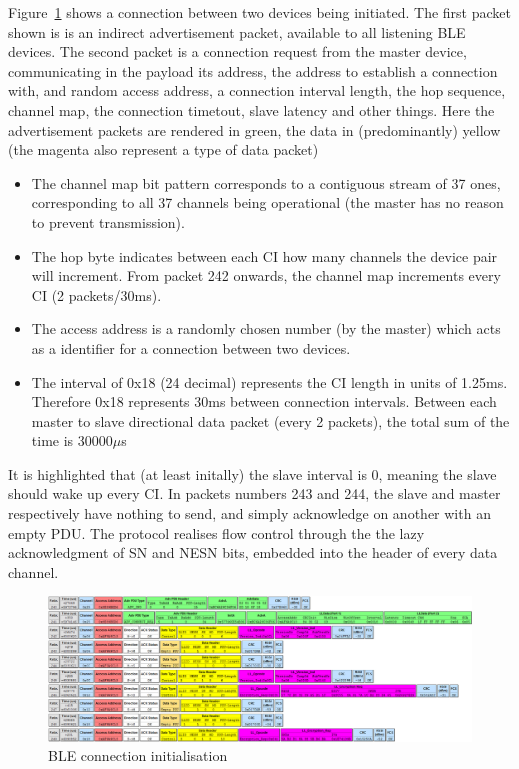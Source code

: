 \documentclass[]{article}
\begin{document}
Figure~\ref{fig:connection} shows a connection between two devices being initiated. The first packet shown is is an indirect advertisement packet, available to all listening \ac{BLE} devices. The second packet is a connection request from the master device, communicating in the payload its address, the address to establish a connection with, and random access address, a connection interval length, the hop sequence, channel map, the connection timetout, slave latency and other things. Here the advertisement packets are rendered in green, the data in (predominantly) yellow (the magenta also represent a type of data packet)
\begin{itemize}

 \item The channel map bit pattern corresponds to a contiguous stream of 37 ones, corresponding to all 37 channels being operational (the master has no reason to prevent transmission). 
 \item The hop byte indicates between each \ac{CI} how many channels the device pair will increment. From packet 242 onwards, the channel map increments every \ac{CI} (2 packets/30ms).
 \item The access address is a randomly chosen number (by the master) which acts as a identifier for a connection between two devices. 
 \item The interval of 0x18 (24 decimal) represents the \ac{CI} length in units of 1.25ms. Therefore 0x18 represents 30ms between connection intervals. Between each master to slave directional data packet (every 2 packets), the total sum of the time is 30000$\mu$s

\end{itemize}

It is highlighted that (at least initally) the slave interval is 0, meaning the slave should wake up every \ac{CI}. In packets numbers 243 and 244, the slave and master respectively have nothing to send, and simply acknowledge on another with an empty \ac{PDU}. The protocol realises flow control through the the lazy acknowledgment of \ac{SN} and \ac{NESN} bits, embedded into the header of every data channel.

\begin{figure}[!h]
	\begin{center}
		\includegraphics[width = 1.4\textwidth, angle=90]{connection}
	\end{center}
	\caption{\ac{BLE} connection initialisation}
	\label{fig:connection}
\end{figure}
\end{document}
